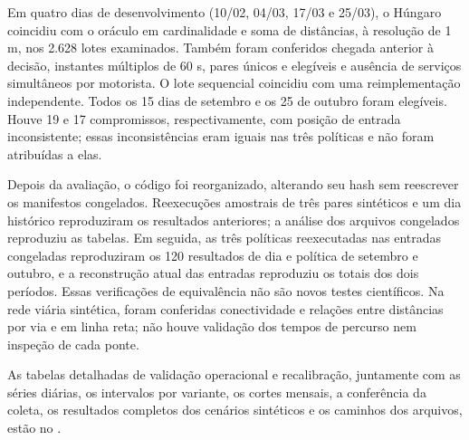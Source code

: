 Em quatro dias de desenvolvimento (10/02, 04/03, 17/03 e 25/03), o Húngaro coincidiu com o oráculo em cardinalidade e soma de distâncias, à resolução de 1 m, nos 2.628 lotes examinados. Também foram conferidos chegada anterior à decisão, instantes múltiplos de 60 s, pares únicos e elegíveis e ausência de serviços simultâneos por motorista. O lote sequencial coincidiu com uma reimplementação independente. Todos os 15 dias de setembro e os 25 de outubro foram elegíveis. Houve 19 e 17 compromissos, respectivamente, com posição de entrada inconsistente; essas inconsistências eram iguais nas três políticas e não foram atribuídas a elas.

Depois da avaliação, o código foi reorganizado, alterando seu hash sem reescrever os manifestos congelados. Reexecuções amostrais de três pares sintéticos e um dia histórico reproduziram os resultados anteriores; a análise dos arquivos congelados reproduziu as tabelas. Em seguida, as três políticas reexecutadas nas entradas congeladas reproduziram os 120 resultados de dia e política de setembro e outubro, e a reconstrução atual das entradas reproduziu os totais dos dois períodos. Essas verificações de equivalência não são novos testes científicos. Na rede viária sintética, foram conferidas conectividade e relações entre distâncias por via e em linha reta; não houve validação dos tempos de percurso nem inspeção de cada ponte.







As tabelas detalhadas de validação operacional e recalibração, juntamente com as séries diárias, os intervalos por variante, os cortes mensais, a conferência da coleta, os resultados completos dos cenários sintéticos e os caminhos dos arquivos, estão no .
